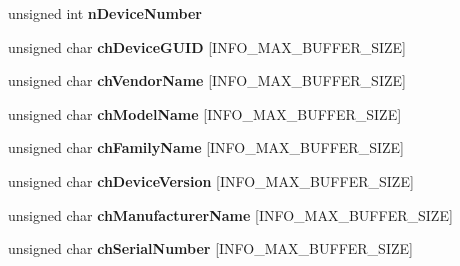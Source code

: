 \begin{DoxyCompactItemize}
unsigned int {\bfseries n\+Device\+Number}
\item 
\mbox{\label{struct___m_v___u_s_b3___d_e_v_i_c_e___i_n_f_o___a5df6ff768b7a1d46d539f6a4b9ed0d61}} 
unsigned char {\bfseries ch\+Device\+G\+U\+ID} \mbox{[}I\+N\+F\+O\+\_\+\+M\+A\+X\+\_\+\+B\+U\+F\+F\+E\+R\+\_\+\+S\+I\+ZE\mbox{]}
\item 
\mbox{\label{struct___m_v___u_s_b3___d_e_v_i_c_e___i_n_f_o___a927bcd2965442a45b35286d216251959}} 
unsigned char {\bfseries ch\+Vendor\+Name} \mbox{[}I\+N\+F\+O\+\_\+\+M\+A\+X\+\_\+\+B\+U\+F\+F\+E\+R\+\_\+\+S\+I\+ZE\mbox{]}
\item 
\mbox{\label{struct___m_v___u_s_b3___d_e_v_i_c_e___i_n_f_o___a1629fd68d248c92ab646bb58818c137b}} 
unsigned char {\bfseries ch\+Model\+Name} \mbox{[}I\+N\+F\+O\+\_\+\+M\+A\+X\+\_\+\+B\+U\+F\+F\+E\+R\+\_\+\+S\+I\+ZE\mbox{]}
\item 
\mbox{\label{struct___m_v___u_s_b3___d_e_v_i_c_e___i_n_f_o___a850b1c67391906d69de9cd61b8ca33ff}} 
unsigned char {\bfseries ch\+Family\+Name} \mbox{[}I\+N\+F\+O\+\_\+\+M\+A\+X\+\_\+\+B\+U\+F\+F\+E\+R\+\_\+\+S\+I\+ZE\mbox{]}
\item 
\mbox{\label{struct___m_v___u_s_b3___d_e_v_i_c_e___i_n_f_o___a59207b42fcef0043694cc19d0215ff6d}} 
unsigned char {\bfseries ch\+Device\+Version} \mbox{[}I\+N\+F\+O\+\_\+\+M\+A\+X\+\_\+\+B\+U\+F\+F\+E\+R\+\_\+\+S\+I\+ZE\mbox{]}
\item 
\mbox{\label{struct___m_v___u_s_b3___d_e_v_i_c_e___i_n_f_o___aafb95c61a1fb071b94c9c41ad231a546}} 
unsigned char {\bfseries ch\+Manufacturer\+Name} \mbox{[}I\+N\+F\+O\+\_\+\+M\+A\+X\+\_\+\+B\+U\+F\+F\+E\+R\+\_\+\+S\+I\+ZE\mbox{]}
\item 
\mbox{\label{struct___m_v___u_s_b3___d_e_v_i_c_e___i_n_f_o___aa36353a498633f18647786843631cbe7}} 
unsigned char {\bfseries ch\+Serial\+Number} \mbox{[}I\+N\+F\+O\+\_\+\+M\+A\+X\+\_\+\+B\+U\+F\+F\+E\+R\+\_\+\+S\+I\+ZE\mbox{]}

\end{DoxyCompactItemize}

